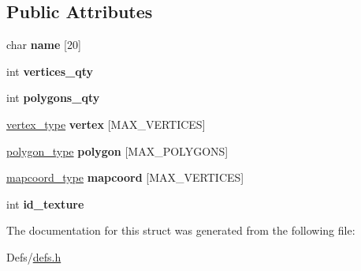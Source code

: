 \subsection*{Public Attributes}
\begin{DoxyCompactItemize}
\item 
char {\bfseries name} \mbox{[}20\mbox{]}\hypertarget{structputar_1_1obj__type_acef3125ad5334ead5ebec173e8f0e2df}{}\label{structputar_1_1obj__type_acef3125ad5334ead5ebec173e8f0e2df}

\item 
int {\bfseries vertices\+\_\+qty}\hypertarget{structputar_1_1obj__type_a3356113c1689dc9acf2ab3e9eb2c9c30}{}\label{structputar_1_1obj__type_a3356113c1689dc9acf2ab3e9eb2c9c30}

\item 
int {\bfseries polygons\+\_\+qty}\hypertarget{structputar_1_1obj__type_ad6e2e366785cceba5a96c76b7676c918}{}\label{structputar_1_1obj__type_ad6e2e366785cceba5a96c76b7676c918}

\item 
\hyperlink{structputar_1_1vertex__type}{vertex\+\_\+type} {\bfseries vertex} \mbox{[}M\+A\+X\+\_\+\+V\+E\+R\+T\+I\+C\+ES\mbox{]}\hypertarget{structputar_1_1obj__type_a2c5d6f456a3bd2fae12bb23c15de7eca}{}\label{structputar_1_1obj__type_a2c5d6f456a3bd2fae12bb23c15de7eca}

\item 
\hyperlink{structputar_1_1polygon__type}{polygon\+\_\+type} {\bfseries polygon} \mbox{[}M\+A\+X\+\_\+\+P\+O\+L\+Y\+G\+O\+NS\mbox{]}\hypertarget{structputar_1_1obj__type_aeb6c3401f044e879c3c131de25d8c479}{}\label{structputar_1_1obj__type_aeb6c3401f044e879c3c131de25d8c479}

\item 
\hyperlink{structputar_1_1mapcoord__type}{mapcoord\+\_\+type} {\bfseries mapcoord} \mbox{[}M\+A\+X\+\_\+\+V\+E\+R\+T\+I\+C\+ES\mbox{]}\hypertarget{structputar_1_1obj__type_a65f52da561b9bc88146f8c2d06e44b99}{}\label{structputar_1_1obj__type_a65f52da561b9bc88146f8c2d06e44b99}

\item 
int {\bfseries id\+\_\+texture}\hypertarget{structputar_1_1obj__type_ac158c6ca2f665f7b549f954955002209}{}\label{structputar_1_1obj__type_ac158c6ca2f665f7b549f954955002209}

\end{DoxyCompactItemize}


The documentation for this struct was generated from the following file\+:\begin{DoxyCompactItemize}
\item 
Defs/\hyperlink{defs_8h}{defs.\+h}\end{DoxyCompactItemize}
